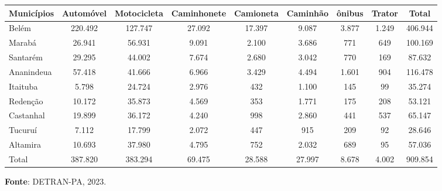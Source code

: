 \begin{table}
\begin{flushleft}
\caption{Exemplo de Tabela Rotacionada devido a Ultrapassagem da Margem (Item 9) , referente a Frota de Veículos Registrados em alguns Municípios Paraenses em dezembro de 2023.}
\end{flushleft}
\label{tabelarotacionada}
    \vspace{0.2cm}
\begin{table}[H]
\begin{tabular}{l|c|c|c|c|c|c|c|c}
\hline\hline
Municípios & Automóvel & Motocicleta & Caminhonete  & Camioneta & Caminhão  & ônibus & Trator & Total     \\
\hline\hline
Belém      & 220.492  & 127.747      & 27.092       & 17.397    & 9.087     & 3.877  & 1.249  & 406.944   \\
Marabá     & 26.941   & 56.931       & 9.091        & 2.100  & 3.686     & 771      & 649     & 100.169   \\
Santarém   & 29.295   & 44.002       & 7.674        & 2.680  & 3.042     & 770      & 169     & 87.632    \\ 
Ananindeua & 57.418   & 41.666       & 6.966        & 3.429  & 4.494     & 1.601    & 904     & 116.478   \\  
Itaituba   & 5.798    & 24.724       & 2.976        & 432    & 1.100     & 145      & 99      & 35.274    \\  
Redenção   & 10.172   & 35.873       & 4.569        & 353    & 1.771     & 175      & 208     & 53.121    \\
Castanhal  & 19.899   & 36.172       & 4.240        & 998    & 2.860     & 441      & 537     &  65.147    \\
Tucuruí    & 7.112    & 17.799       & 2.072        & 447    & 915       & 209      & 92      &  28.646    \\
Altamira   & 10.693   & 37.980       & 4.795        & 752    & 2.032     & 689      & 95      &  57.036   \\
\hline\hline
  Total    & 387.820  & 383.294      & 69.475      & 28.588  & 27.997    & 8.678    & 4.002   &  909.854  \\
\hline\hline 
\end{tabular}
\end{table}
\begin{flushleft}
\hspace{0.2cm}
\textbf{Fonte}: DETRAN-PA, 2023. 
\end{flushleft}
\end{table}






















